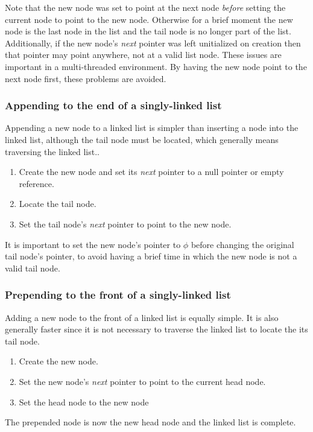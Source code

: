\documentclass{article}
\begin{document}
  Note that the new node was set to point at the next node \emph{before} setting the current node to point to the new node. Otherwise for a brief moment the new node is the last node in the list and the tail node is no longer part of the list. Additionally, if the new node's \emph{next} pointer was left unitialized on creation then that pointer may point anywhere, not at a valid list node. These issues are important in a multi-threaded environment. By having the new node point to the next node first, these problems are avoided.
  \subsubsection{Appending to the end of a singly-linked list}
  Appending a new node to a linked list is simpler than inserting a node into the linked list, although the tail node must be located, which generally means traversing the linked list..
  \begin{enumerate}
    \item Create the new node and set its \emph{next} pointer to a null pointer or empty reference.
    \item Locate the tail node.
    \item Set the tail node's \emph{next} pointer to point to the new node.
  \end{enumerate}
  It is important to set the new node's pointer to $\phi$ before changing the original tail node's pointer, to avoid having a brief time in which the new node is not a valid tail node.
  \subsubsection{Prepending to the front of a singly-linked list}
  Adding a new node to the front of a linked list is equally simple. It is also generally faster since it is not necessary to traverse the linked list to locate the its tail node.
  \begin{enumerate}
    \item Create the new node.
    \item Set the new node's \emph{next} pointer to point to the current head node.
    \item Set the head node to the new node
  \end{enumerate}
  The prepended node is now the new head node and the linked list is complete.
\end{document}
